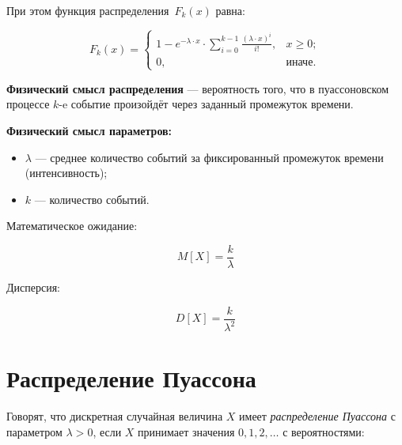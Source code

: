 При этом функция распределения~$F_k(x)$ равна:

\begin{equation}
	F_k(x) =
	\begin{cases}
		 1 - e^{-\lambda \cdot x} \cdot \sum_{i = 0}^{k-1} \frac{(\lambda \cdot x)^i}{i!}, & x \ge 0;\\
		 0,  & \text{иначе}.
	\end{cases}
\end{equation}

\textbf{Физический смысл распределения} --- вероятность того, что в пуассоновском процессе $k$-e событие произойдёт через заданный промежуток времени.

\textbf{Физический смысл параметров:}

\begin{itemize}
	\item  $\lambda$ --- среднее количество событий за фиксированный промежуток времени (интенсивность);
	
	\item $k$ --- количество событий.
\end{itemize}




Математическое ожидание:

\begin{equation}
	M[X] = \frac{k}{\lambda}
\end{equation}

Дисперсия: 

\begin{equation}
	D[X] = \frac{k}{\lambda^2}
\end{equation}

\chapter{Распределение Пуассона} %

Говорят, что  дискретная случайная величина $X$ имеет \textit{распределение Пуассона} с параметром $\lambda > 0$, если $X$ принимает значения $0, 1, 2, \dots$ с вероятностями:

